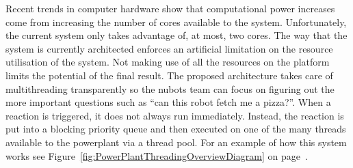 \documentclass[english,12pt]{scrartcl}
\begin{document}
			Recent trends in computer hardware show that computational power increases come from increasing the number of cores available to the system.
			Unfortunately, the current system only takes advantage of, at most, two cores.
			The way that the system is currently architected enforces an artificial limitation on the resource utilisation of the system. Not making use of all the resources on the platform limits the potential of the final result.
			The proposed architecture takes care of multithreading transparently so the \gls{nubots} team can focus on figuring out the more important questions such as ``can this robot fetch me a pizza?''.
			When a \gls{reaction} is triggered, it does not always run immediately.
			Instead, the \gls{reaction} is put into a blocking priority queue and then executed on one of the many threads available to the \gls{powerplant} via a thread pool. 
			For an example of how this system works see Figure~\ref{fig:PowerPlantThreadingOverviewDiagram} on page~\pageref{fig:PowerPlantThreadingOverviewDiagram}.
\end{document}
